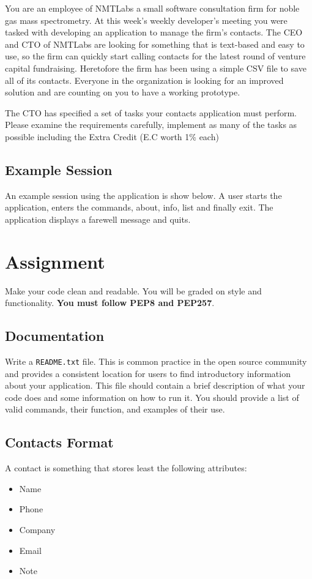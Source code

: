 \documentclass[11pt]{cselabheader}
\begin{document}
You are an employee of NMTLabs a small software consultation firm for
noble gas mass spectrometry. At this week's weekly developer's meeting
you were tasked with developing an application to manage the firm's
contacts. The CEO and CTO of NMTLabs are looking for something that is
text-based and easy to use, so the firm can quickly start calling
contacts for the latest round of venture capital fundraising.
Heretofore the firm has been using a simple CSV file to save all of
its contacts.  Everyone in the organization is looking for an improved
solution and are counting on you to have a working prototype.

The CTO has specified a set of tasks your contacts application must
perform. Please examine the requirements carefully, implement as many
of the tasks as possible including the Extra Credit (E.C worth 1\%
each)

\subsection{Example Session}
An example session using the application is show below. A user starts
the application, enters the commands, about, info, list and finally
exit.  The application displays a farewell message and quits.

\begin{verbatimcode}
\end{verbatimcode}

\section{Assignment}
Make your code clean and readable. You will be graded on style and
functionality.  \textbf{You must follow PEP8 and PEP257}.

\subsection{Documentation}
Write a \texttt{README.txt} file. This is common practice in the open
source community and provides a consistent location for users to find
introductory information about your application. This file should
contain a brief description of what your code does and some
information on how to run it.  You should provide a list of valid
commands, their function, and examples of their use.

\subsection{Contacts Format}
A contact is something that stores least the following attributes:
\begin{itemize}
\item Name
\item Phone
\item Company
\item Email
\item Note %
\end{itemize}
\end{document}
